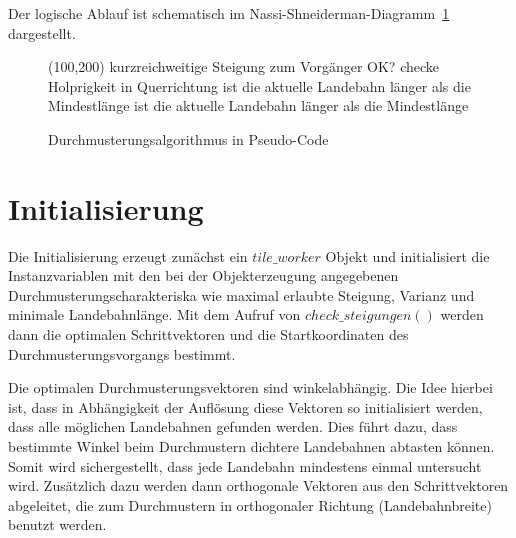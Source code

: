 \documentclass[10pt,a4paper]{report}
\begin{document}
Der logische Ablauf ist schematisch im Nassi-Shneiderman-Diagramm~\ref{nasshnlogisch} dargestellt.

\clearpage
\begin{figure}
\begin{struktogramm}(100,200)\label{nasshnlogisch}
{kurzreichweitige Steigung zum Vorgänger OK?}{\sTrue}{\sFalse}
{checke Holprigkeit in Querrichtung}{\sTrue}{\sFalse}
\change
{}
{ist die aktuelle Landebahn länger als die Mindestlänge}{\sTrue}{\sFalse}
\change
{}
\ifend
\ifend
\change
{}
{ist die aktuelle Landebahn länger als die Mindestlänge}{\sTrue}{\sFalse}
\change
{}
\ifend
{}
\ifend
\forallinend
\end{struktogramm}
\caption{Durchmusterungsalgorithmus in Pseudo-Code}
\end{figure}
\clearpage
\section{Initialisierung}

Die Initialisierung erzeugt zunächst ein $tile\_worker$ Objekt und initialisiert die Instanzvariablen mit den bei der Objekterzeugung angegebenen Durchmusterungscharakteriska wie maximal erlaubte Steigung, Varianz und minimale Landebahnlänge.
Mit dem Aufruf von $check\_steigungen()$ werden dann die optimalen Schrittvektoren und die Startkoordinaten des Durchmusterungsvorgangs bestimmt.

Die optimalen Durchmusterungsvektoren sind winkelabhängig. Die Idee hierbei ist, dass in Abhängigkeit der Auflösung diese Vektoren so initialisiert werden, dass alle möglichen Landebahnen gefunden werden. Dies führt dazu, dass bestimmte Winkel beim Durchmustern dichtere Landebahnen abtasten können. Somit wird sichergestellt, dass jede Landebahn mindestens einmal untersucht wird.
Zusätzlich dazu werden dann orthogonale Vektoren aus den Schrittvektoren abgeleitet, die zum Durchmustern in orthogonaler Richtung (Landebahnbreite) benutzt werden.
\end{document}
